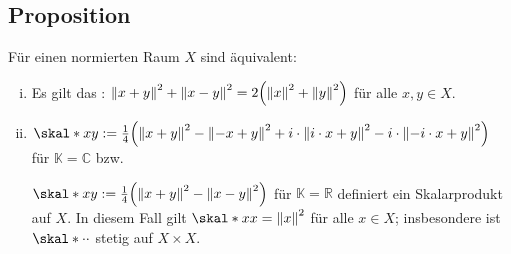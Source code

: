 \subsection[Proposition über Zusammenhang von Norm und Skalarprodukt mit dem Parallelogrammgesetz]{Proposition} %
\label{sub:77}
Für einen normierten Raum $X$ sind äquivalent: 
\begin{enumerate}[(i)]
	\item Es gilt das : $\norm{x+y}^2 + \norm{x-y}^2 = 2 \enbrace*{\norm{x}^2 + \norm{y}^2}$ für alle $x,y \in X$.
	\item $\skal*{x}{y} := \frac{1}{4} \enbrace*{\norm{x+y}^2 - \norm{-x+y}^2 + i \cdot \norm{i \cdot x +y}^2 - i \cdot \norm{-i \cdot x+ y}^2}$ für $\mathds{K}=\mathds{C}$ bzw.
	
	$\skal*{x}{y} := \frac{1}{4} \enbrace*{\norm{x+y}^2 - \norm{x-y}^2}$ für $\mathds{K}=\mathds{R}$ definiert ein Skalarprodukt auf $X$. In diesem Fall gilt
	$\skal*{x}{x} = \norm{x}^2$ für alle $x \in X$; insbesondere ist $\skal*{\cdot}{\cdot}$ stetig auf $X \times X$.
\end{enumerate}
